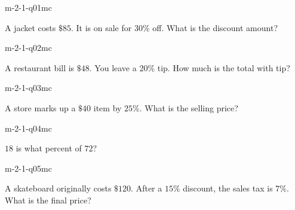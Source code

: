 

\begin{practiceQuestion}{m-2-1-q01}{mc}
\begin{questionText}
A jacket costs $\$85$. It is on sale for $30\%$ off. What is the discount amount?
\end{questionText}
\end{practiceQuestion}

\begin{practiceQuestion}{m-2-1-q02}{mc}
\begin{questionText}
A restaurant bill is $\$48$. You leave a $20\%$ tip. How much is the total with tip?
\end{questionText}
\end{practiceQuestion}

\begin{practiceQuestion}{m-2-1-q03}{mc}
\begin{questionText}
A store marks up a $\$40$ item by $25\%$. What is the selling price?
\end{questionText}
\end{practiceQuestion}

\begin{practiceQuestion}{m-2-1-q04}{mc}
\begin{questionText}
$18$ is what percent of $72$?
\end{questionText}
\end{practiceQuestion}

\begin{practiceQuestion}{m-2-1-q05}{mc}
\begin{questionText}
A skateboard originally costs $\$120$. After a $15\%$ discount, the sales tax is $7\%$. What is the final price?
\end{questionText}
\end{practiceQuestion}

